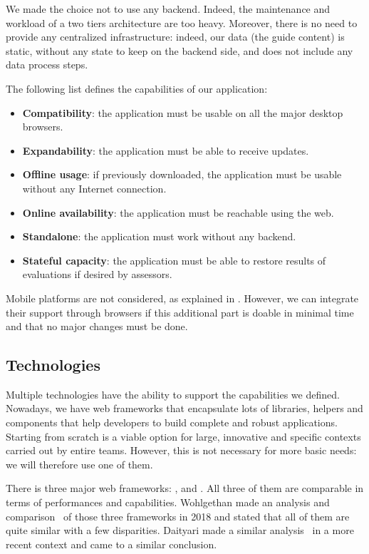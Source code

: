 We made the choice not to use any \gls{backend}. Indeed, the maintenance and workload of a two tiers architecture are too heavy. Moreover, there is no need to provide any centralized infrastructure: indeed, our data (the guide content) is static, without any state to keep on the \gls{backend} side, and does not include any data process steps.

The following list defines the capabilities of our application:
\begin{itemize}
    \item \textbf{Compatibility}: the application must be usable on all the major desktop browsers.
    \item \textbf{Expandability}: the application must be able to receive updates.
    \item \textbf{Offline usage}: if previously downloaded, the application must be usable without any Internet connection.
    \item \textbf{Online availability}: the application must be reachable using the web.
    \item \textbf{Standalone}: the application must work without any \gls{backend}.
    \item \textbf{Stateful capacity}: the application must be able to restore results of evaluations if desired by assessors.
\end{itemize}

Mobile platforms are not considered, as explained in . However, we can integrate their support through browsers if this additional part is doable in minimal time and that no major changes must be done.

\subsection{Technologies}
\label{subsec:app_analyse_technologies}

Multiple technologies have the ability to support the capabilities we defined. Nowadays, we have web \glspl{framework} that encapsulate lots of libraries, helpers and components that help developers to build complete and robust applications. Starting from scratch is a viable option for large, innovative and specific contexts carried out by entire teams. However, this is not necessary for more basic needs: we will therefore use one of them.

There is three major web \glspl{framework}: ,  and . All three of them are comparable in terms of performances and capabilities. Wohlgethan made an analysis and comparison~\cite{wohlgethan2018supportingweb} of those three \glspl{framework} in 2018 and stated that all of them are quite similar with a few disparities. Daityari made a similar analysis~\cite{codeinwp_2022} in a more recent context and came to a similar conclusion.

